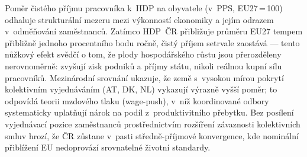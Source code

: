Poměr čistého příjmu pracovníka k~\ac{HDP} na obyvatele (v~\ac{PPS}, EU27\,=\,100) odhaluje strukturální mezeru mezi výkonností ekonomiky a jejím odrazem v~odměňování zaměstnanců.
Zatímco \ac{HDP}~ČR přibližuje průměru EU27 tempem přibližně jednoho procentního bodu ročně, čistý příjem setrvale zaostává --- tento nůžkový efekt svědčí o tom, že plody hospodářského růstu jsou přerozděleny nerovnoměrně: zvyšují zisk podniků a příjmy státu, nikoli reálnou kupní sílu pracovníků.
Mezinárodní srovnání ukazuje, že země s~vysokou mírou pokrytí kolektivním vyjednáváním (AT, DK, NL) vykazují výrazně vyšší poměr; to odpovídá teorii mzdového tlaku (wage-push), v~níž koordinované odbory systematicky uplatňují nárok na podíl z~produktivitního přebytku.
Bez posílení vyjednávací pozice zaměstnanců prostřednictvím rozšíření závaznosti kolektivních smluv hrozí, že ČR zůstane v~pasti středně-příjmové konvergence, kde nominální přiblížení \ac{EU} nedoprovází srovnatelné životní standardy.


